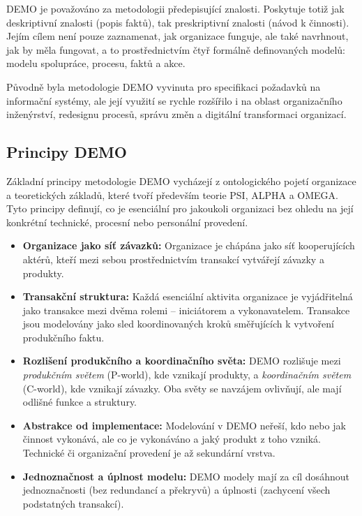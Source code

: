 DEMO je považováno za metodologii předepisující znalosti. Poskytuje totiž jak deskriptivní znalosti (popis faktů), tak preskriptivní znalosti (návod k činnosti). Jejím cílem není pouze zaznamenat, jak organizace funguje, ale také navrhnout, jak by měla fungovat, a to prostřednictvím čtyř formálně definovaných modelů: modelu spolupráce, procesu, faktů a akce. \cite{Dietz2020,Hunka2019}

Původně byla metodologie DEMO vyvinuta pro specifikaci požadavků na informační systémy, ale její využití se rychle rozšířilo i na oblast organizačního inženýrství, redesignu procesů, správu změn a digitální transformaci organizací. \cite{Dietz2020,Dietz1999}


\subsection{Principy DEMO}
\label{sec:principy-demo}

Základní principy metodologie DEMO vycházejí z ontologického pojetí organizace a teoretických základů, které tvoří především teorie PSI, ALPHA a OMEGA. Tyto principy definují, co je esenciální pro jakoukoli organizaci bez ohledu na její konkrétní technické, procesní nebo personální provedení. \cite{Pergl2023DEMO_modely,Dietz2020}

\begin{itemize}
  \item \textbf{Organizace jako síť závazků:} Organizace je chápána jako síť kooperujících aktérů, kteří mezi sebou prostřednictvím transakcí vytvářejí závazky a produkty.
  \item \textbf{Transakční struktura:} Každá esenciální aktivita organizace je vyjádřitelná jako transakce mezi dvěma rolemi – iniciátorem a vykonavatelem. Transakce jsou modelovány jako sled koordinovaných kroků směřujících k vytvoření produkčního faktu.
  \item \textbf{Rozlišení produkčního a koordinačního světa:} DEMO rozlišuje mezi \textit{produkčním světem} (P-world), kde vznikají produkty, a \textit{koordinačním světem} (C-world), kde vznikají závazky. Oba světy se navzájem ovlivňují, ale mají odlišné funkce a struktury.
  \item \textbf{Abstrakce od implementace:} Modelování v DEMO neřeší, kdo nebo jak činnost vykonává, ale co je vykonáváno a jaký produkt z toho vzniká. Technické či organizační provedení je až sekundární vrstva.
  \item \textbf{Jednoznačnost a úplnost modelu:} DEMO modely mají za cíl dosáhnout jednoznačnosti (bez redundancí a překryvů) a úplnosti (zachycení všech podstatných transakcí). \cite{Dietz1999}
\end{itemize}


